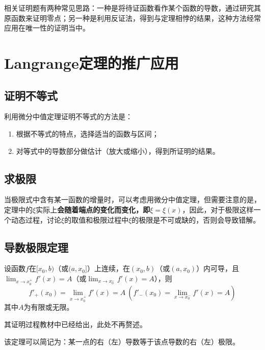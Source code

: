 相关证明题有两种常见思路：一种是将待证函数看作某个函数的导数，通过研究其原函数来证明零点；另一种是利用反证法，得到与定理相悖的结果，这种方法经常应用在唯一性的证明当中。

\section{Langrange定理的推广应用}\label{sec:4.6}
\subsection{证明不等式}\label{sec:4.6.1}

利用微分中值定理证明不等式的方法是：
\begin{enumerate}
	\item 根据不等式的特点，选择适当的函数与区间；
	\item 对等式中的导数部分做估计（放大或缩小），得到所证明的结果。
\end{enumerate}

\subsection{求极限}\label{sec:4.6.2}

当极限式中含有某一函数的增量时，可以考虑用微分中值定理，但需要注意的是，定理中的$\xi$实际上\textbf{会随着端点的变化而变化，即$\xi=\xi (x)$}，因此，对于极限这样一个动态过程，讨论$\xi$的取值和极限过程中$\xi$的极限是不可或缺的，否则会导致错解。

\subsection{导数极限定理}\label{sec:4.6.3}

\begin{theorem}
	设函数$f$在$[x_0,b)$（或$(a,x_0]$）上连续，在$(x_0,b)$（或$(a,x_0)$）内可导，且$\lim_{x\to x_0^+}f'(x)=A$（或$\lim_{x\to x_0^-}f'(x)=A$），则
	\begin{equation}
		f'_+(x_0)=\lim_{x\to x_0^+}f'(x)=A~(f'_-(x_0)=\lim_{x\to x_0^-}f'(x)=A)\label{eq:4.5}
	\end{equation}
	其中$A$为有限或无限。
\end{theorem}

其证明过程教材中已经给出，此处不再赘述。

\begin{remark}
	该定理可以简记为：某一点的右（左）导数等于该点导数的右（左）极限。
\end{remark}

